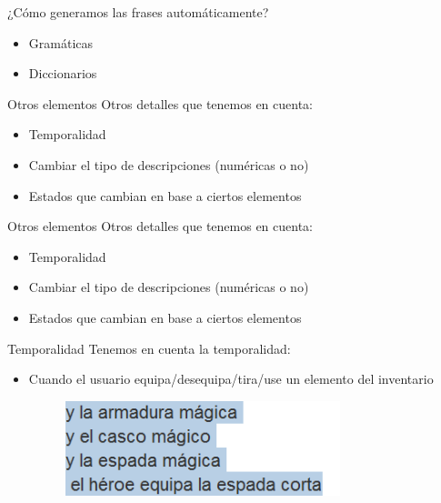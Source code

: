 \begin{tframe}{¿Cómo generamos las frases automáticamente?}
	\begin{itemize}
		\item Gramáticas
		\item<+-| alert@+> Diccionarios
	\end{itemize}
\end{tframe}



\begin{frame}[t, fragile]{Otros elementos}
	Otros detalles que tenemos en cuenta:
	\begin{itemize}
		\item<+-| alert@+> Temporalidad
		\item Cambiar el tipo de descripciones (numéricas o no)
		\item Estados que cambian en base a ciertos elementos
	\end{itemize}
\end{frame}

\begin{frame}[t, fragile]{Otros elementos}
	Otros detalles que tenemos en cuenta:
	\begin{itemize}
		\item Temporalidad
		\item Cambiar el tipo de descripciones (numéricas o no)
		\item Estados que cambian en base a ciertos elementos
	\end{itemize}
\end{frame}

\begin{frame}[t, fragile]{Temporalidad}
	Tenemos en cuenta la temporalidad:
	\begin{itemize}
		\item<+-| alert@+> Cuando el usuario equipa/desequipa/tira/use un elemento del inventario
		\begin{figure}[h]
			\includegraphics[width=8cm]{../img/temporalidadEquipar.PNG}
		\end{figure}
	\end{itemize}
\end{frame}

